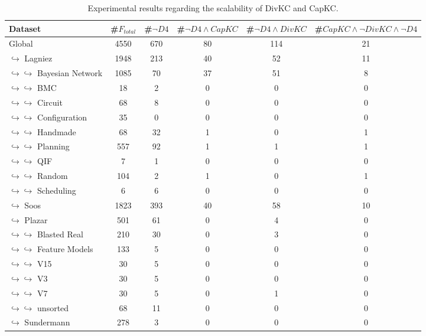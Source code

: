 \documentclass{article}
\newcommand\dfour[0]{D4\xspace}
\newcommand\divkc[0]{DivKC\xspace}
\newcommand\capkc[0]{CapKC\xspace}
\begin{document}
    
\begin{table}[h!]
        \centering
        \begin{tabular}{l|c|c|c|c|c}
            Dataset & \#$F_\textit{total}$ & \#$\neg \textit{\dfour}$ & \#$\neg \textit{\dfour} \land \textit{\capkc}$ & \#$\neg \textit{\dfour} \land \textit{\divkc}$ &  \#$\textit{\capkc} \land \neg \textit{\divkc} \land \neg \textit{\dfour}$\\ 
            \hline
Global & 4550 & 670 & 80 & 114 & 21 \\
$\hookrightarrow$ Lagniez \cite{D4} & 1948 & 213 & 40 & 52 & 11 \\
$\hookrightarrow \hookrightarrow$ Bayesian Network & 1085 & 70 & 37 & 51 & 8 \\
$\hookrightarrow \hookrightarrow$ BMC & 18 & 2 & 0 & 0 & 0 \\
$\hookrightarrow \hookrightarrow$ Circuit & 68 & 8 & 0 & 0 & 0 \\
$\hookrightarrow \hookrightarrow$ Configuration & 35 & 0 & 0 & 0 & 0 \\
$\hookrightarrow \hookrightarrow$ Handmade & 68 & 32 & 1 & 0 & 1 \\
$\hookrightarrow \hookrightarrow$ Planning & 557 & 92 & 1 & 1 & 1 \\
$\hookrightarrow \hookrightarrow$ QIF & 7 & 1 & 0 & 0 & 0 \\
$\hookrightarrow \hookrightarrow$ Random & 104 & 2 & 1 & 0 & 1 \\
$\hookrightarrow \hookrightarrow$ Scheduling & 6 & 6 & 0 & 0 & 0 \\
$\hookrightarrow$ Soos \cite{soos_2024_10449477} & 1823 & 393 & 40 & 58 & 10 \\
$\hookrightarrow$ Plazar \cite{Plazar2019} & 501 & 61 & 0 & 4 & 0 \\
$\hookrightarrow \hookrightarrow$ Blasted Real & 210 & 30 & 0 & 3 & 0 \\
$\hookrightarrow \hookrightarrow$ Feature Models & 133 & 5 & 0 & 0 & 0 \\
$\hookrightarrow \hookrightarrow$ V15 & 30 & 5 & 0 & 0 & 0 \\
$\hookrightarrow \hookrightarrow$ V3 & 30 & 5 & 0 & 0 & 0 \\
$\hookrightarrow \hookrightarrow$ V7 & 30 & 5 & 0 & 1 & 0 \\
$\hookrightarrow \hookrightarrow$ unsorted & 68 & 11 & 0 & 0 & 0 \\
$\hookrightarrow$ Sundermann \cite{SBK+:SPLC24} & 278 & 3 & 0 & 0 & 0 \\
    \end{tabular}
            \caption{Experimental results regarding the scalability of \divkc and \capkc.
        }
        \label{divkc:tab:gen}
    \end{table}
\end{document}
